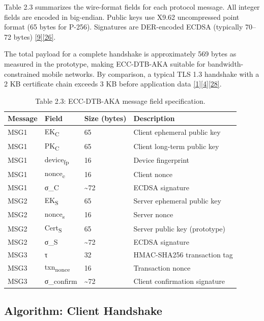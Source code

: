 \indent Table 2.3 summarizes the wire-format fields for each protocol message. All integer fields are encoded in big-endian. Public keys use X9.62 uncompressed point format (65 bytes for P-256). Signatures are DER-encoded ECDSA (typically 70--72 bytes) \hyperref[ref:9]{[9]}\hyperref[ref:26]{[26]}.

\indent The total payload for a complete handshake is approximately 569 bytes as measured in the prototype, making ECC-DTB-AKA suitable for bandwidth-constrained mobile networks. By comparison, a typical TLS 1.3 handshake with a 2 KB certificate chain exceeds 3 KB before application data \hyperref[ref:1]{[1]}\hyperref[ref:4]{[4]}\hyperref[ref:28]{[28]}.

\begin{table}[htbp]
\centering
\begin{tabular}{llll}
\toprule
Message & Field & Size (bytes) & Description \\
\midrule
MSG1 & EK\textsubscript{C} & 65 & Client ephemeral public key \\
MSG1 & PK\textsubscript{C} & 65 & Client long-term public key \\
MSG1 & device\textsubscript{fp} & 16 & Device fingerprint \\
MSG1 & nonce\textsubscript{c} & 16 & Client nonce \\
MSG1 & σ\_C & \textasciitilde{}72 & ECDSA signature \\
MSG2 & EK\textsubscript{S} & 65 & Server ephemeral public key \\
MSG2 & nonce\textsubscript{s} & 16 & Server nonce \\
MSG2 & Cert\textsubscript{S} & 65 & Server public key (prototype) \\
MSG2 & σ\_S & \textasciitilde{}72 & ECDSA signature \\
MSG3 & τ & 32 & HMAC-SHA256 transaction tag \\
MSG3 & txn\textsubscript{nonce} & 16 & Transaction nonce \\
MSG3 & σ\_confirm & \textasciitilde{}72 & Client confirmation signature \\
\bottomrule
\end{tabular}
\caption{Table 2.3: ECC-DTB-AKA message field specification.}\label{tbl:2.3}
\end{table}
\subsection{Algorithm: Client Handshake}

